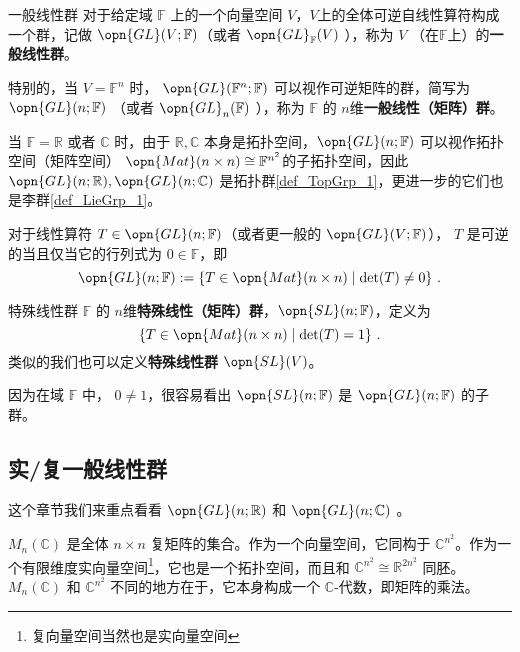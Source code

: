 

\begin{definition}{一般线性群}\label{def_GL_1}
对于给定域 $\mathbb{F}$ 上的一个向量空间 $V$，$V$上的全体可逆自线性算符构成一个群，记做 $\opn{GL}(V; \mathbb{F})$（或者 $\opn{GL}_{\mathbb{F}}(V)$ ），称为 $V$ （在$\mathbb{F}$上）的\textbf{一般线性群}。

特别的，当 $V = \mathbb{F}^n$ 时， $\opn{GL}(\mathbb{F}^n; \mathbb{F})$ 可以视作可逆矩阵的群，简写为 $\opn{GL}(n; \mathbb{F})$ （或者 $\opn{GL}_n(\mathbb{F})$ ），称为 $\mathbb{F}$ 的 $n$维\textbf{一般线性（矩阵）群}。

当 $\mathbb{F} = \mathbb{R}$ 或者 $\mathbb{C}$ 时，由于 $\mathbb{R}, \mathbb{C}$ 本身是拓扑空间，$\opn{GL}(n; \mathbb{F})$ 可以视作拓扑空间（矩阵空间） $\opn{Mat}(n \times n) \cong \mathbb{F}^{n^2}$的子拓扑空间，因此 $\opn{GL}(n; \mathbb{R}), \opn{GL}(n; \mathbb{C})$ 是拓扑群\autoref{def_TopGrp_1}，更进一步的它们也是李群\autoref{def_LieGrp_1}。
\end{definition}

对于线性算符 $T \in \opn{GL}(n; \mathbb{F})$（或者更一般的 $\opn{GL}(V; \mathbb{F})$）， $T$ 是可逆的当且仅当它的行列式为 $0 \in \mathbb{F}$，即
$$
\opn{GL}(n; \mathbb{F}): = \{T \in \opn{Mat}(n \times n) \mid \det(T) \neq 0\}~.
$$

\begin{definition}{特殊线性群}
$\mathbb{F}$ 的 $n$维\textbf{特殊线性（矩阵）群}，$\opn{SL}(n; \mathbb{F})$，定义为
$$
\{T \in \opn{Mat}(n \times n) \mid \det(T) = 1\}~.
$$
类似的我们也可以定义\textbf{特殊线性群} $\opn{SL}(V)$。
\end{definition}

因为在域 $\mathbb{F}$ 中， $0 \neq 1$，很容易看出 $\opn{SL}(n; \mathbb{F})$ 是 $\opn{GL}(n; \mathbb{F})$ 的子群。

\subsection{实/复一般线性群}

这个章节我们来重点看看 $\opn{GL}(n; \mathbb{R})$ 和 $\opn{GL}(n; \mathbb{C})$ 。

$M_n(\mathbb{C})$ 是全体 $n \times n$ 复矩阵的集合。作为一个向量空间，它同构于 $\mathbb{C}^{n^2}$。作为一个有限维度实向量空间\footnote{复向量空间当然也是实向量空间}，它也是一个拓扑空间，而且和 $\mathbb{C}^{n^2} \cong \mathbb{R}^{2 n^2}$ 同胚。$M_n(\mathbb{C})$ 和 $\mathbb{C}^{n^2}$ 不同的地方在于，它本身构成一个 $\mathbb{C}$-代数，即矩阵的乘法。

